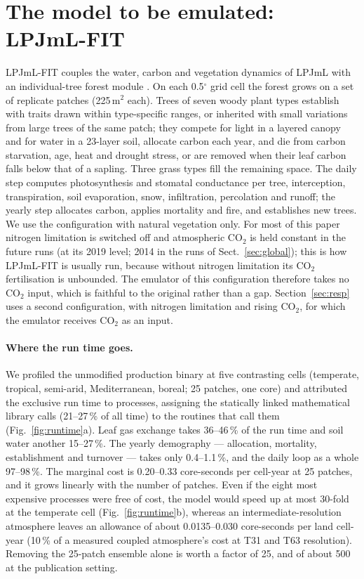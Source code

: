 \documentclass[11pt,a4paper]{article}
\begin{document}
\section{The model to be emulated: LPJmL-FIT}\label{sec:target}

LPJmL-FIT couples the water, carbon and vegetation dynamics of LPJmL \citep{Schaphoff2018} with an individual-tree
forest module \citep{Sakschewski2015,Thonicke2020}. On each 0.5$^\circ$ grid cell the forest grows on a set of
replicate patches (225\,m$^2$ each). Trees of seven woody plant types establish with traits drawn within type-specific
ranges, or inherited with small variations from large trees of the same patch; they compete for light in a layered
canopy and for water in a 23-layer soil, allocate carbon each year, and die from carbon starvation, age, heat and
drought stress, or are removed when their leaf carbon falls below that of a sapling. Three grass types fill the
remaining space. The daily step computes photosynthesis and stomatal conductance per tree, interception,
transpiration, soil evaporation, snow, infiltration, percolation and runoff; the yearly step allocates carbon, applies
mortality and fire, and establishes new trees. We use the configuration with natural vegetation only. For most of this
paper nitrogen limitation is switched off and atmospheric CO$_2$ is held constant in the future runs (at its 2019
level; 2014 in the runs of Sect.~\ref{sec:global}); this is how LPJmL-FIT is usually run, because without nitrogen
limitation its CO$_2$ fertilisation is unbounded. The emulator of this configuration therefore takes no CO$_2$ input,
which is faithful to the original rather than a gap. Section~\ref{sec:resp} uses a second configuration, with nitrogen
limitation \citep{vonBloh2018} and rising CO$_2$, for which the emulator receives CO$_2$ as an input.

\paragraph{Where the run time goes.} We profiled the unmodified production binary at five contrasting cells
(temperate, tropical, semi-arid, Mediterranean, boreal; 25 patches, one core) and attributed the exclusive run time to
processes, assigning the statically linked mathematical library calls (21--27\,\% of all time) to the routines that
call them (Fig.~\ref{fig:runtime}a). Leaf gas exchange takes 36--46\,\% of the run time and soil water another
15--27\,\%. The yearly demography --- allocation, mortality, establishment and turnover --- takes only 0.4--1.1\,\%,
and the daily loop as a whole 97--98\,\%. The marginal cost is 0.20--0.33 core-seconds per cell-year at 25 patches,
and it grows linearly with the number of patches. Even if the eight most expensive processes were free of cost, the
model would speed up at most 30-fold at the temperate cell (Fig.~\ref{fig:runtime}b), whereas an
intermediate-resolution atmosphere leaves an allowance of about 0.0135--0.030 core-seconds per land cell-year (10\,\%
of a measured coupled atmosphere's cost at T31 and T63 resolution). Removing the 25-patch ensemble alone is worth a
factor of 25, and of about 500 at the publication setting.
\end{document}
